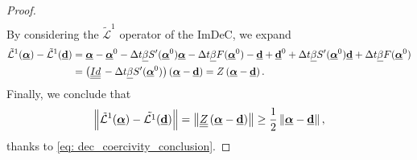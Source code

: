 \begin{proof}
\begin{align}
	\end{align}
	By considering the $\tilde{\mathcal{L}}^1$ operator of the ImDeC, we expand
	\begin{align*}
	\tilde{\mathcal{L}}^1(\bbc)-\tilde{\mathcal{L}}^1(\bbd)&=\bbc-\bbc^0-\Delta t\vec{\beta}S'(\bbc^0)\bbc -\Delta t\vec{\beta}F(\bbc^0) - \bbd+\bbd^0+\Delta t\vec{\beta}S'(\bbc^0)\bbd +\Delta t\vec{\beta}F(\bbc^0)\\
	&=\left(\mat{Id}-\Delta t \vec{\beta}S'(\bbc^0)\right)\left(\bbc-\bbd\right)%
	=Z\left(\bbc-\bbd\right).
	\end{align*}
	Finally, we conclude that
\begin{equation}
\norm{\tilde{\mathcal{L}}^1 (\bbc)-\tilde{\mathcal{L}^1} (\bbd)} = \norm{\mat{Z}(\bbc -\bbd )} \geq \frac12 \norm{\bbc -\bbd },
\end{equation} 
thanks to  \eqref{eq: dec_coercivity_conclusion}.
\end{proof}

